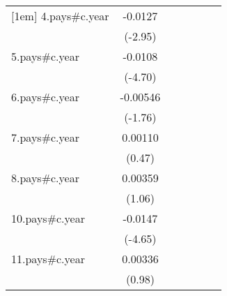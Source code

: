 {\begin{tabular}{l*{6}{c}}
[1em]
4.pays#c.year       &     -0.0127\sym{**} &                     &                     &                     &                     &                     \\
                    &     (-2.95)         &                     &                     &                     &                     &                     \\
[1em]
5.pays#c.year       &     -0.0108\sym{***}&                     &                     &                     &                     &                     \\
                    &     (-4.70)         &                     &                     &                     &                     &                     \\
[1em]
6.pays#c.year       &    -0.00546         &                     &                     &                     &                     &                     \\
                    &     (-1.76)         &                     &                     &                     &                     &                     \\
[1em]
7.pays#c.year       &     0.00110         &                     &                     &                     &                     &                     \\
                    &      (0.47)         &                     &                     &                     &                     &                     \\
[1em]
8.pays#c.year       &     0.00359         &                     &                     &                     &                     &                     \\
                    &      (1.06)         &                     &                     &                     &                     &                     \\
[1em]
10.pays#c.year      &     -0.0147\sym{***}&                     &                     &                     &                     &                     \\
                    &     (-4.65)         &                     &                     &                     &                     &                     \\
[1em]
11.pays#c.year      &     0.00336         &                     &                     &                     &                     &                     \\
                    &      (0.98)         &                     &                     &                     &                     &                     \\

\end{tabular}}

